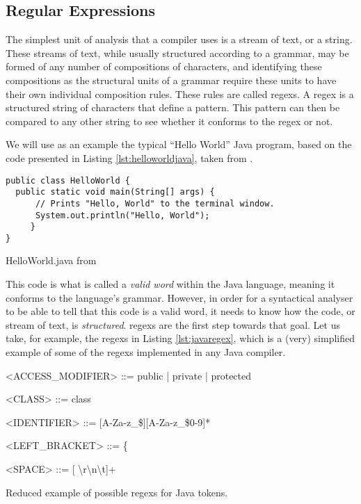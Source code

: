 
\subsection{Regular Expressions}
\label{sc:regex}

The simplest unit of analysis that a compiler uses is a stream of text, or a string. These streams of text, while usually structured according to a \gls{grammar}, may be formed of any number of compositions of characters, and identifying these compositions as the structural units of a \gls{grammar} require these units to have their own individual composition rules. These rules are called \gls{regex}s. A \gls{regex} is a structured string of characters that define a pattern. This pattern can then be compared to any other string to see whether it conforms to the \gls{regex} or not.

We will use as an example the typical ``Hello World'' Java program, based on the code presented in Listing \ref{lst:helloworldjava}, taken from \cite{SEDGEWICK:2011}.

\begin{listing}
\begin{verbatim}
public class HelloWorld {
  public static void main(String[] args) {
      // Prints "Hello, World" to the terminal window.
      System.out.println("Hello, World");
     }
}
\end{verbatim}
\caption{HelloWorld.java from \cite{SEDGEWICK:2011}} \label{lst:helloworldjava}
\end{listing}

This code is what is called a \emph{valid word} within the Java language, meaning it conforms to the language's \gls{grammar}. However, in order for a syntactical analyser to be able to tell that this code is a valid word, it needs to know how the code, or stream of text, is \emph{structured}. \Gls{regex}s are the first step towards that goal. Let us take, for example, the \gls{regex}s in Listing \ref{lst:javaregex}, which is a (very) simplified example of some of the \gls{regex}s implemented in any Java compiler.

\begin{listing}
\begin{grammar}
<ACCESS_MODIFIER> ::= public | private | protected

<CLASS> ::= class

<IDENTIFIER> ::= [A-Za-z_\$][A-Za-z_\$0-9]*

<LEFT_BRACKET> ::= \{

<SPACE> ::= [ \textbackslash r\textbackslash n\textbackslash t]+
\end{grammar}
\caption{Reduced example of possible \gls{regex}s for Java tokens.} \label{lst:javaregex}
\end{listing}

